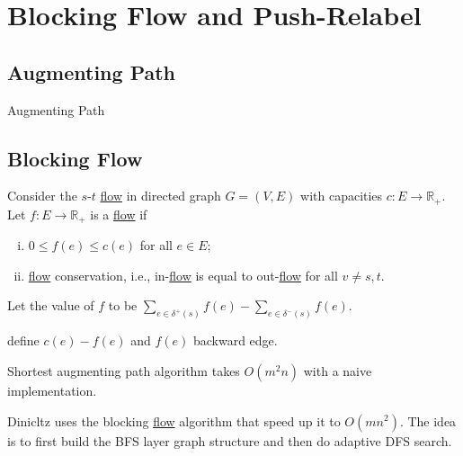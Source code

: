 \chapter{Blocking Flow and Push-Relabel}
\section{Augmenting Path}


\begin{algorithm}[H]\label{algo:augmenting-path}
	\DontPrintSemicolon{}
	\caption{Augmenting Path}
	\BlankLine


	\;
\end{algorithm}

\section{Blocking Flow}
Consider the \(s\)-\(t\) \hyperref[def:flow]{flow} in directed graph \(G = (V, E)\) with capacities \(c \colon E \to \mathbb{R} _{+}\). Let \(f \colon E \to \mathbb{R} _{+}\) is a \hyperref[def:flow]{flow} if
\begin{enumerate}[(i)]
	\item \(0 \leq f(e) \leq c(e)\) for all \(e \in E\);
	\item \hyperref[def:flow]{flow} conservation, i.e., in-\hyperref[def:flow]{flow} is equal to out-\hyperref[def:flow]{flow} for all \(v \neq s, t\).
\end{enumerate}
Let the value of \(f\) to be \(\sum_{e \in \delta ^+(s)} f(e) - \sum_{e \in \delta ^-(s)} f(e)\).

\begin{definition}
	define \(c(e) - f(e)\) and \(f(e)\) backward edge.
\end{definition}

Shortest augmenting path algorithm takes \(O(m^2 n)\) with a naive implementation.

Dinicltz uses the blocking \hyperref[def:flow]{flow} algorithm that speed up it to \(O(mn^2)\). The idea is to first build the BFS layer graph structure and then do adaptive DFS search.


